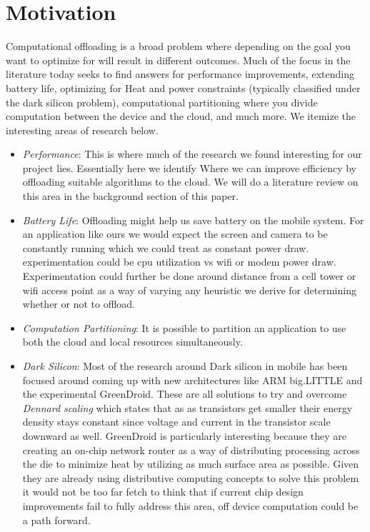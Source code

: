 \documentclass{sig-alternate}
\begin{document}
\section{Motivation}
Computational offloading is a broad problem  where depending on the goal you want to optimize for will result in different outcomes. Much of the focus in the literature today seeks to find answers for performance improvements, extending battery life, optimizing for Heat and power constraints (typically classified under the dark silicon problem), computational partitioning where you divide computation between the device and the cloud, and much more. We itemize the interesting areas of research below. 
\begin{itemize}
\item \textit{Performance}:
This is where much of the research we found interesting for our project lies. Essentially here we identify Where we can improve efficiency by offloading suitable algorithms to the cloud. We will do a literature review on this area in the background section of this paper.
\item \textit{Battery Life}:
Offloading might help us save battery on the mobile system. For an application like ours we would expect the screen and camera to be constantly running which we could treat as constant power draw. experimentation could be cpu utilization vs wifi  or modem power draw. Experimentation could further be done around distance from a cell tower or wifi access point as a way of varying any heuristic we derive for determining whether or not to offload. \cite{wifiBattery}
\item \textit{Computation Partitioning}:
 It is possible to partition an application to use both the cloud and local resources simultaneously.\cite{partitioning}
\item \textit{Dark Silicon}:
Most of the research around Dark silicon in mobile has been focused around coming up with new architectures like ARM big.LITTLE and the experimental GreenDroid. These are all solutions to try and overcome \textit{Dennard scaling} which states that as as transistors get smaller their energy density stays constant since voltage and current in the transistor scale downward as well. \cite{darkSilicon} GreenDroid is particularly interesting because they are creating an on-chip network router as a way of distributing processing across the die to minimize heat by utilizing as much surface area as possible. \cite{greenDroid}
Given they are already using distributive computing concepts to solve this problem it would not be too far fetch to think that if current chip design improvements fail to fully address this area, off device computation could be a path forward.

\end{itemize}
\end{document}
